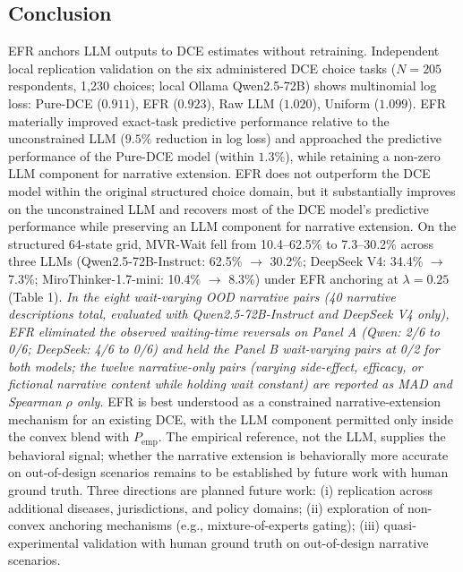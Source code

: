\documentclass[11pt]{article}
\begin{document}
\subsection{Conclusion}\nopagebreak\label{sec:conclusion}

EFR anchors LLM outputs to DCE estimates without retraining. Independent local replication validation on the six administered DCE choice tasks ($N=205$ respondents, 1,230 choices; local Ollama Qwen2.5-72B) shows multinomial log loss: Pure-DCE ($0.911$), EFR ($0.923$), Raw LLM ($1.020$), Uniform ($1.099$). EFR materially improved exact-task predictive performance relative to the unconstrained LLM ($9.5\%$ reduction in log loss) and approached the predictive performance of the Pure-DCE model (within $1.3\%$), while retaining a non-zero LLM component for narrative extension. EFR does not outperform the DCE model within the original structured choice domain, but it substantially improves on the unconstrained LLM and recovers most of the DCE model's predictive performance while preserving an LLM component for narrative extension. On the structured 64-state grid, MVR-Wait fell from 10.4--62.5\% to 7.3--30.2\% across three LLMs (Qwen2.5-72B-Instruct: 62.5\% $\to$ 30.2\%; DeepSeek V4: 34.4\% $\to$ 7.3\%; MiroThinker-1.7-mini: 10.4\% $\to$ 8.3\%) under EFR anchoring at $\lambda = 0.25$ (Table 1). \emph{In the eight wait-varying OOD narrative pairs (40 narrative descriptions total, evaluated with Qwen2.5-72B-Instruct and DeepSeek V4 only), EFR eliminated the observed waiting-time reversals on Panel A (Qwen: 2/6 to 0/6; DeepSeek: 4/6 to 0/6) and held the Panel B wait-varying pairs at 0/2 for both models; the twelve narrative-only pairs (varying side-effect, efficacy, or fictional narrative content while holding wait constant) are reported as MAD and Spearman $\rho$ only.} EFR is best understood as a constrained narrative-extension mechanism for an existing DCE, with the LLM component permitted only inside the convex blend with $P_{\text{emp}}$. The empirical reference, not the LLM, supplies the behavioral signal; whether the narrative extension is behaviorally more accurate on out-of-design scenarios remains to be established by future work with human ground truth. Three directions are planned future work: (i) replication across additional diseases, jurisdictions, and policy domains; (ii) exploration of non-convex anchoring mechanisms (e.g., mixture-of-experts gating); (iii) quasi-experimental validation with human ground truth on out-of-design narrative scenarios.

\clearpage
\end{document}
